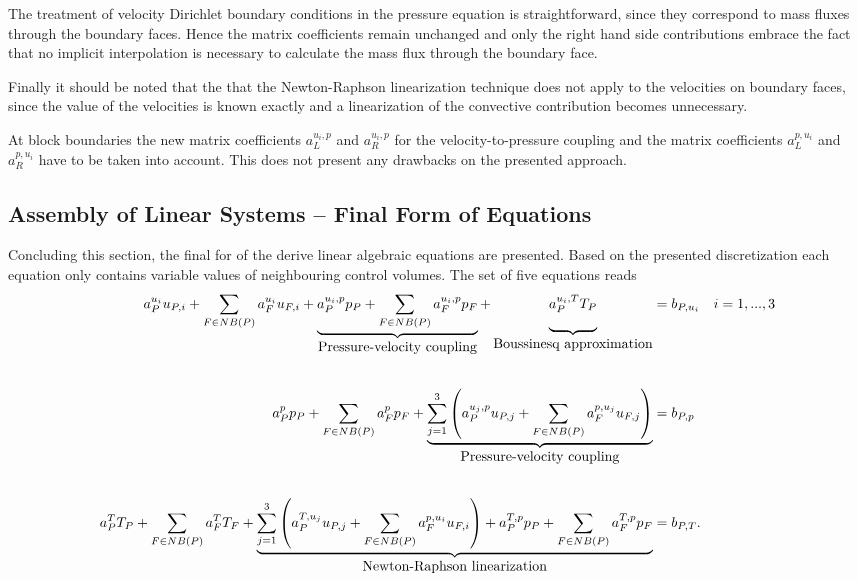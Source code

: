 The treatment of velocity Dirichlet boundary conditions in the pressure equation is straightforward, since they correspond to mass fluxes through the boundary faces. Hence the matrix coefficients remain unchanged and only the right hand side contributions embrace the fact that no implicit interpolation is necessary to calculate the mass flux through the boundary face.

Finally it should be noted that the that the Newton-Raphson linearization technique does not apply to the velocities on boundary faces, since the value of the velocities is known exactly and a linearization of the convective contribution becomes unnecessary.


At block boundaries the new matrix coefficients \(a_L^{u_i,p}\) and \(a_R^{u_i,p}\) for the velocity-to-pressure coupling and the matrix coefficients \(a_L^{p,u_i}\) and \(a_R^{p,u_i}\) have to be taken into account. This does not present any drawbacks on the presented approach.

\subsection{Assembly of Linear Systems -- Final Form of Equations}

Concluding this section, the final for of the derive linear algebraic equations are presented. Based on the presented discretization each equation only contains variable values of neighbouring control volumes. The set of five equations reads
\begin{align}
  a_P^{u_i} u_{P,i} + \sum_{F \in NB(P)} a_F^{u_i} u_{F,i} + \underbrace{\vphantom{\sum_F}{a_P^{u_i,p} p_P+ \sum_{F \in NB(P)} a_F^{u_i,p} p_F}}_{\hbox{Pressure-velocity coupling}} + \underbrace{\vphantom{\sum_F}{ a_P^{u_i,T} T_P}}_{\hbox{Boussinesq approximation}} &= b_{P,u_i} \quad i=1,...,3  \\[2.0em]
  a_P^{p} p_{P} + \sum_{F \in NB(P)} a_F^{p} p_F + \underbrace{ \sum_{j=1}^3 \left(a_P^{u_j,p} u_{P,j}+ \sum_{F \in NB(P)} a_F^{p,u_j} u_{F,j} \right)}_{\hbox{Pressure-velocity coupling}} &= b_{P,p}  \\[2.0em]
  a_P^{T} T_{P} + \sum_{F \in NB(P)} a_F^{T} T_F + \underbrace{\sum_{j=1}^3 \left(a_P^{T,u_j} u_{P,j}+ \sum_{F \in NB(P)} a_F^{p,u_i} u_{F,i} \right) + a_P^{T,p} p_P + \sum_{F \in NB(P) } a_F^{T,p} p_F}_{\hbox{Newton-Raphson linearization}} &= b_{P,T}.
\end{align}



